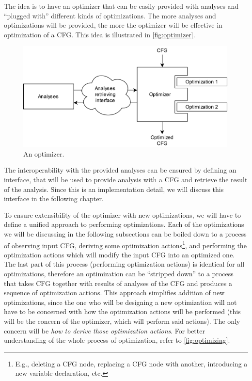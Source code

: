 \documentclass[thesis=M,english]{FITthesis}[2019/12/23]
\begin{document}
The idea is to have an optimizer that can be easily provided with analyses and “plugged with” different kinds of optimizations. The more analyses and optimizations will be provided, the more the optimizer will be effective in optimization of a CFG. This idea is illustrated in \autoref{fig:optimizer}.

\begin{figure}
    \centering
    \includegraphics[height=5.5cm]{img/optimizer}
    \caption{An optimizer.}\label{fig:optimizer}
\end{figure}

The interoperability with the provided analyses can be ensured by defining an interface, that will be used to provide analysis with a CFG and retrieve the result of the analysis. Since this is an implementation detail, we will discuss this interface in the following chapter.

To ensure extensibility of the optimizer with new optimizations, we will have to define a unified approach to performing optimizations. Each of the optimizations we will be discussing in the following subsections can be boiled down to a process of observing input CFG, deriving some optimization actions\footnote{E.g., deleting a CFG node, replacing a CFG node with another, introducing a new variable declaration, etc.}, and performing the optimization actions which will modify the input CFG into an optimized one. The last part of this process (performing optimization actions) is identical for all optimizations, therefore an optimization can be “stripped down” to a process that takes CFG together with results of analyses of the CFG and produces a sequence of optimization actions. This approach simplifies addition of new optimizations, since the one who will be designing a new optimization will not have to be concerned with how the optimization actions will be performed (this will be the concern of the optimizer, which will perform said actions). The only concern will be \emph{how to derive those optimization actions}. For better understanding of the whole process of optimization, refer to \autoref{fig:optimizing}.
\end{document}
